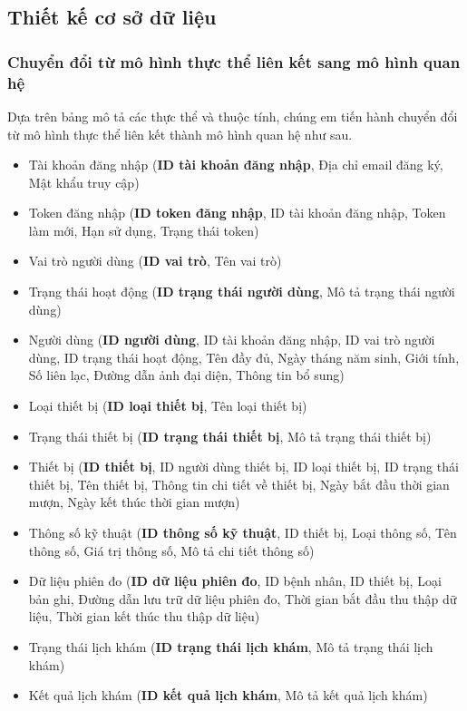 \subsection{Thiết kế cơ sở dữ liệu}

\subsubsection{Chuyển đổi từ mô hình thực thể liên kết sang mô hình quan hệ}
Dựa trên bảng mô tả các thực thể và thuộc tính, chúng em tiến hành chuyển đổi từ mô hình thực thể liên kết thành mô hình quan hệ như sau.

\begin{itemize}
	\item Tài khoản đăng nhập (\textbf{ID tài khoản đăng nhập}, Địa chỉ email đăng ký, Mật khẩu truy cập)
	\item Token đăng nhập (\textbf{ID token đăng nhập}, ID tài khoản đăng nhập, Token làm mới, Hạn sử dụng, Trạng thái token)
	\item Vai trò người dùng (\textbf{ID vai trò}, Tên vai trò)
	\item Trạng thái hoạt động (\textbf{ID trạng thái người dùng}, Mô tả trạng thái người dùng)
	\item Người dùng (\textbf{ID người dùng}, ID tài khoản đăng nhập, ID vai trò người dùng, ID trạng thái hoạt động, Tên đầy đủ, Ngày tháng năm sinh, Giới tính, Số liên lạc, Đường dẫn ảnh đại diện, Thông tin bổ sung)
	\item Loại thiết bị (\textbf{ID loại thiết bị}, Tên loại thiết bị)
	\item Trạng thái thiết bị (\textbf{ID trạng thái thiết bị}, Mô tả trạng thái thiết bị)
	\item Thiết bị (\textbf{ID thiết bị}, ID người dùng thiết bị, ID loại thiết bị, ID trạng thái thiết bị, Tên thiết bị, Thông tin chi tiết về thiết bị, Ngày bắt đầu thời gian mượn, Ngày kết thúc thời gian mượn)
	\item Thông số kỹ thuật (\textbf{ID thông số kỹ thuật}, ID thiết bị, Loại thông số, Tên thông số, Giá trị thông số, Mô tả chi tiết thông số)
	\item Dữ liệu phiên đo (\textbf{ID dữ liệu phiên đo}, ID bệnh nhân, ID thiết bị, Loại bản ghi, Đường dẫn lưu trữ dữ liệu phiên đo, Thời gian bắt đầu thu thập dữ liệu, Thời gian kết thúc thu thập dữ liệu)
	\item Trạng thái lịch khám (\textbf{ID trạng thái lịch khám}, Mô tả trạng thái lịch khám)
	\item Kết quả lịch khám (\textbf{ID kết quả lịch khám}, Mô tả kết quả lịch khám)

\end{itemize}

